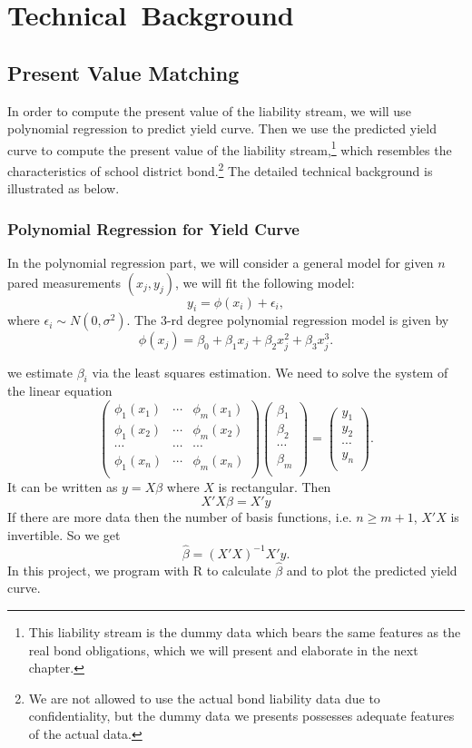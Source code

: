 \documentclass[oneside,12pt]{report}
\begin{document}
{\chapter{Technical~Background}\label{}
\section{Present Value Matching}

In order to compute the present value of the liability stream, we will use polynomial regression to predict yield curve. Then we use the predicted yield curve to compute the present value of the liability stream,\footnote{This liability stream is the dummy data which bears the same features as the real bond obligations, which we will present and elaborate in the next chapter.} which resembles the characteristics of school district bond.\footnote{We are not allowed to use the actual bond liability data due to confidentiality, but the dummy data we presents possesses adequate features of the actual data.} The detailed technical background is illustrated as below.
\subsection{Polynomial Regression for Yield Curve}
In the polynomial regression part, we will consider a general model for given $n$ pared measurements $(x_j,y_j)$, we will fit the following model:
$$y_i=\phi(x_i) + \epsilon_i,$$
where $\epsilon_i \sim N(0,\sigma^2)$. 
 The 3-rd degree polynomial regression model is given by
$$\phi(x_j)= \beta_0 + \beta_1 x_j + \beta_2 x_j^2+ \beta_3 x_j^3.$$

\noindent we estimate $\beta_i$ via the least squares
estimation. We need to solve the system of the linear equation
$$ \left(%
\begin{array}{ccc}
  \phi_1(x_1)  &\cdots & \phi_m(x_1) \\
\phi_1(x_2)  &\cdots & \phi_m(x_2) \\
\cdots  & \cdots & \cdots\\
\phi_1(x_n)  &\cdots & \phi_m(x_n) \\
\end{array}\right)
\left(
\begin{array}{c}
  \beta_1 \\
  \beta_2\\
  \cdots\\
  \beta_m\\
\end{array}%
\right) = \left(%
\begin{array}{c}
  y_1 \\
  y_2\\
  \cdots\\
  y_n \\
\end{array}%
\right).$$ It can be written as $y = X\beta$ where $X$ is
rectangular. Then
$$X'X\beta = X'y$$
If there are more data then the number of basis functions, i.e. $n
\geq m+1$, $X'X$ is invertible. So we get
$$\hat \beta = (X'X)^{-1}X'y.$$
In this project, we program with R to calculate $\hat \beta$ and to plot the predicted yield curve.

}
\end{document}
